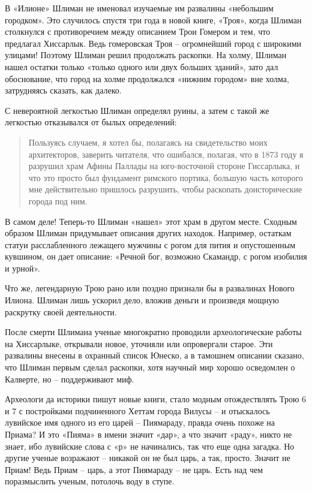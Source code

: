 В «Илионе» Шлиман не именовал изучаемые им развалины «небольшим городком». Это случилось спустя три года в новой книге, «Троя», когда Шлиман столкнулся с противоречием между описанием Трои Гомером и тем, что предлагал Хиссарлык. Ведь гомеровская Троя – огромнейший город с широкими улицами! Поэтому Шлиман решил продолжать раскопки. На холму, Шлиман нашел остатки только «только одного или двух больших зданий», зато дал обоснование, что город на холме продолжался «нижним городом» вне холма, затрудняясь сказать, как далеко.

С невероятной легкостью Шлиман определял руины, а затем с такой же легкостью отказывался от былых определений:

\begin{quotation}
Пользуясь случаем, я хотел бы, полагаясь на свидетельство моих архитекторов, заверить читателя, что ошибался, полагая, что в 1873 году я разрушил храм Афины Паллады на юго-восточной стороне Гиссарлыка, и что это просто был фундамент римского портика, большую часть которого мне действительно пришлось разрушить, чтобы раскопать доисторические города под ним. 
\end{quotation}

В самом деле! Теперь-то Шлиман «нашел» этот храм в другом месте. Сходным образом Шлиман придумывает описания других находок. Например, остаткам статуи расслабленного лежащего мужчины с рогом для пития и опустошенным кувшином, он дает описание: «Речной бог, возможно Скамандр, с рогом изобилия и урной».

Что же, легендарную Трою рано или поздно признали бы в развалинах Нового Илиона. Шлиман лишь ускорил дело, вложив деньги и произведя мощную раскрутку своей деятельности. 

После смерти Шлимана ученые многократно проводили археологические работы на Хиссарлыке, открывали новое, уточняли или опровергали старое. Эти развалины внесены в охранный список Юнеско, а в тамошнем описании сказано, что Шлиман первым сделал раскопки, хотя научный мир хорошо осведомлен о Калверте, но – поддерживают миф.

Археологи да историки пишут новые книги, стало модным отождествлять Трою 6 и 7 с постройками подчиненного Хеттам города Вилусы – и отыскалось лувийское имя одного из его царей – Пиямараду, правда очень похоже на Приама? И это «Пияма» в имени значит «дар», а что значит «раду», никто не знает, ибо лувийские слова с «р» не начинались, так что еще одна загадка. Но другие ученые возражают – никакой он не был царь, а так, просто. Значит не Приам! Ведь Приам – царь, а этот Пиямараду – не царь. Есть над чем поразмыслить ученым, потолочь воду в ступе.

